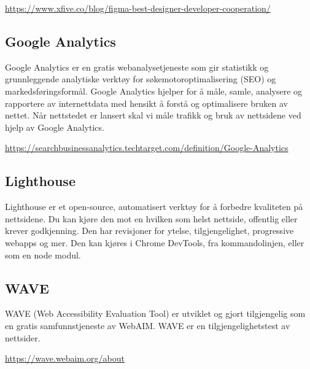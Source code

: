 \url{https://www.xfive.co/blog/figma-best-designer-developer-cooperation/}

\subsection{ Google Analytics}
Google Analytics er en gratis webanalysetjeneste som gir statistikk og grunnleggende analytiske verktøy for søkemotoroptimalisering (SEO) og markedsføringsformål. Google Analytics hjelper for å måle, samle, analysere og rapportere av internettdata med hensikt å forstå og optimalisere bruken av nettet.
Når nettstedet er lansert skal vi måle trafikk og bruk av nettsidene ved hjelp av Google Analytics.

\url{https://searchbusinessanalytics.techtarget.com/definition/Google-Analytics}

\subsection{Lighthouse}
Lighthouse er et open-source, automatisert verktøy for å forbedre kvaliteten på nettsidene. Du kan kjøre den mot en hvilken som helst nettside, offentlig eller krever godkjenning. Den har revisjoner for ytelse, tilgjengelighet, progressive webapps og mer. Den kan kjøres i Chrome DevTools, fra kommandolinjen, eller som en node modul.

\subsection{WAVE}
WAVE (Web Accessibility Evaluation Tool) er utviklet og gjort tilgjengelig som en gratis samfunnstjeneste av WebAIM. WAVE er en tilgjengelighetstest av nettsider.

\url{https://wave.webaim.org/about}
\clearpage